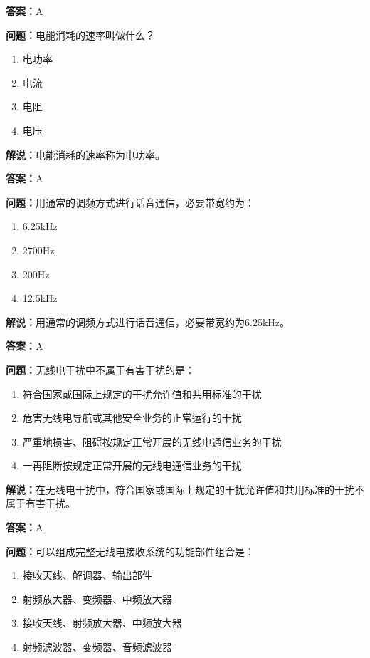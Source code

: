 \documentclass[UTF8]{ctexbook}
\begin{document}
\textbf{答案：}A

\textbf{问题：}电能消耗的速率叫做什么？

\begin{enumerate}[label=\Alph*), leftmargin=3em]
  \item 电功率
  \item 电流
  \item 电阻
  \item 电压
\end{enumerate}

\textbf{解说：}电能消耗的速率称为电功率。

\textbf{答案：}A

\textbf{问题：}用通常的调频方式进行话音通信，必要带宽约为：

\begin{enumerate}[label=\Alph*), leftmargin=3em]
  \item 6.25kHz
  \item 2700Hz
  \item 200Hz
  \item 12.5kHz
\end{enumerate}

\textbf{解说：}用通常的调频方式进行话音通信，必要带宽约为6.25kHz。%

\textbf{答案：}A

\textbf{问题：}无线电干扰中不属于有害干扰的是：

\begin{enumerate}[label=\Alph*), leftmargin=3em]
  \item 符合国家或国际上规定的干扰允许值和共用标准的干扰
  \item 危害无线电导航或其他安全业务的正常运行的干扰
  \item 严重地损害、阻碍按规定正常开展的无线电通信业务的干扰
  \item 一再阻断按规定正常开展的无线电通信业务的干扰
\end{enumerate}

\textbf{解说：}在无线电干扰中，符合国家或国际上规定的干扰允许值和共用标准的干扰不属于有害干扰。%

\textbf{答案：}A

\textbf{问题：}可以组成完整无线电接收系统的功能部件组合是：

\begin{enumerate}[label=\Alph*), leftmargin=3em]
  \item 接收天线、解调器、输出部件
  \item 射频放大器、变频器、中频放大器
  \item 接收天线、射频放大器、中频放大器
  \item 射频滤波器、变频器、音频滤波器
\end{enumerate}
\end{document}
